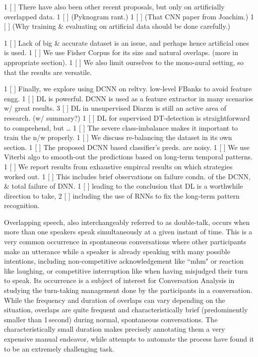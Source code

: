 \documentclass[a4paper]{article}
\begin{document}
{       1 [ ] There have also been other recent proposals, but only on artificially overlapped data.
       1 [ ] (Pyknogram rant.)
       1 [ ] (That CNN paper from Joachim.)
       1 [ ] (Why training & evaluating on artificial data should be done carefully.)

       1 [ ] Lack of big & accurate dataset is an issue, and perhaps hence artificial ones is used.
       1 [ ] We use Fisher Corpus for its size and natural overlaps. (more in appropriate section).
       1 [ ] We also limit ourselves to the mono-aural setting, so that the results are versatile.

       1 [ ] Finally, we explore using DCNN on reltvy. low-level FBanks to avoid feature engg.
       1 [ ] DL is powerful. DCNN is used as a feature extractor in many scenarios w/ great results.
       3 [ ] DL in unsupervised Diarzn is still an active area of research. (w/ summary?)
       1 [ ] DL for supervised DT-detection is straightforward to comprehend, but \ldots
       1 [ ] The severe class-imbalance makes it important to train the n/w properly.
       1 [ ] We discuss re-balancing the dataset in its own section.
       1 [ ] The proposed DCNN based classifier's preds. are noisy.
       1 [ ] We use Viterbi algo to smooth-out the predictions based on long-term temporal patterns.
       1 [ ] We report results from exhaustive empircal results on which strategies worked out.
       1 [ ] This includes brief observations on failure condn. of the DCNN, & total failure of DNN.
       1 [ ] leading to the conclusion that DL is a worthwhile direction to take,
       2 [ ] including the use of RNNs to fix the long-term pattern recognition.
}


Overlapping speech, also interchangeably referred to as double-talk,
occurs when more than one speakers speak simultaneously at a given instant of time.
This is a very common occurrence in spontaneous conversations where other participants make an utterance while a speaker is already speaking with many possible intentions,
including non-competitive acknowledgement like “mhm" or reaction like laughing,
or competitive interruption like when having misjudged their turn to speak.
Its occurrence
is a subject of interest for Conversation Analysis in studying the turn-taking management done by the participants in a conversation.
While the frequency and duration of overlaps can vary depending on the situation,
overlaps are quite frequent and characteristically brief (predominently smaller than 1\,second)
during normal, spontaneous conversations.  %
The characteristically small duration makes precisely annotating them a very expensive manual endeavor,
while attempts to automate the process have found it to be an extremely challenging task.
\end{document}
